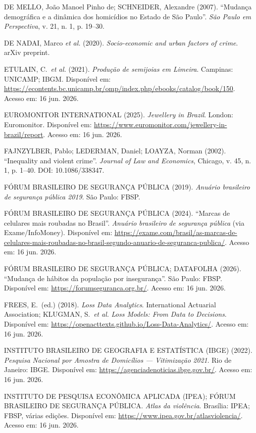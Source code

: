 \documentclass[11pt,a4paper]{article}
\begin{document}
DE MELLO, João Manoel Pinho de; SCHNEIDER, Alexandre (2007). ``Mudança demográfica e a dinâmica dos homicídios no Estado de São Paulo''. \emph{São Paulo em Perspectiva}, v. 21, n. 1, p. 19--30.

DE NADAI, Marco \emph{et al.} (2020). \emph{Socio-economic and urban factors of crime}. arXiv preprint.

ETULAIN, C.\ \emph{et al.} (2021). \emph{Produção de semijoias em Limeira}. Campinas: UNICAMP; IBGM. Disponível em: \url{https://econtents.bc.unicamp.br/omp/index.php/ebooks/catalog/book/150}. Acesso em: 16 jun. 2026.

EUROMONITOR INTERNATIONAL (2025). \emph{Jewellery in Brazil}. London: Euromonitor. Disponível em: \url{https://www.euromonitor.com/jewellery-in-brazil/report}. Acesso em: 16 jun. 2026.

FAJNZYLBER, Pablo; LEDERMAN, Daniel; LOAYZA, Norman (2002). ``Inequality and violent crime''. \emph{Journal of Law and Economics}, Chicago, v. 45, n. 1, p. 1--40. DOI: 10.1086/338347.

FÓRUM BRASILEIRO DE SEGURANÇA PÚBLICA (2019). \emph{Anuário brasileiro de segurança pública 2019}. São Paulo: FBSP.

FÓRUM BRASILEIRO DE SEGURANÇA PÚBLICA (2024). ``Marcas de celulares mais roubadas no Brasil''. \emph{Anuário brasileiro de segurança pública} (via Exame/InfoMoney). Disponível em: \url{https://exame.com/brasil/as-marcas-de-celulares-mais-roubadas-no-brasil-segundo-anuario-de-seguranca-publica/}. Acesso em: 16 jun. 2026.

FÓRUM BRASILEIRO DE SEGURANÇA PÚBLICA; DATAFOLHA (2026). ``Mudança de hábitos da população por insegurança''. São Paulo: FBSP. Disponível em: \url{https://forumseguranca.org.br/}. Acesso em: 16 jun. 2026.

FREES, E.\ (ed.) (2018). \emph{Loss Data Analytics}. International Actuarial Association; KLUGMAN, S.\ \emph{et al.} \emph{Loss Models: From Data to Decisions}. Disponível em: \url{https://openacttexts.github.io/Loss-Data-Analytics/}. Acesso em: 16 jun. 2026.

INSTITUTO BRASILEIRO DE GEOGRAFIA E ESTATÍSTICA (IBGE) (2022). \emph{Pesquisa Nacional por Amostra de Domicílios --- Vitimização 2021}. Rio de Janeiro: IBGE. Disponível em: \url{https://agenciadenoticias.ibge.gov.br/}. Acesso em: 16 jun. 2026.

INSTITUTO DE PESQUISA ECONÔMICA APLICADA (IPEA); FÓRUM BRASILEIRO DE SEGURANÇA PÚBLICA. \emph{Atlas da violência}. Brasília: IPEA; FBSP, várias edições. Disponível em: \url{https://www.ipea.gov.br/atlasviolencia/}. Acesso em: 16 jun. 2026.
\end{document}
